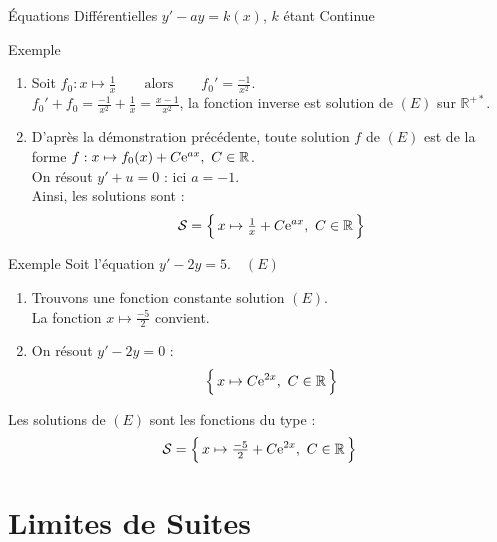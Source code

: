 \documentclass{coursbook}
\begin{document}
\begin{Gpartie}{Équations Différentielles $y'-ay=k(x)$, $k$ étant Continue}
\begin{Spartie}{Exemple}
            \begin{enumerate}
                \item Soit $f_0:x\mapsto\frac{1}{x}\qquad\text{alors}\qquad f_0'=\frac{-1}{x^2}$. \\
                $f_0'+f_0=\frac{-1}{x^2}+\frac{1}{x}=\frac{x-1}{x^2}$, la fonction inverse est solution de $(E)$ sur $\mathbb{R^{+*}}$.
                \item D'après la démonstration précédente, toute solution $f$ de $(E)$ est de la forme $f:x\mapsto f_0(x)+C\me^{ax},\ C\in\mathbb{R}$. \\
                On résout $y'+u=0$ : ici $a=-1$. \\
                Ainsi, les solutions sont :
                \[\mathcal{S}=\Big\{\,x\mapsto\tfrac{1}{x}+C\me^{ax},\ C\in\mathbb{R}\,\Big\}\]
            \end{enumerate}
        \end{Spartie}
        \begin{Spartie}{Exemple} 
            Soit l'équation $y'-2y=5$.$\quad(E)$
            \begin{enumerate}
                \item Trouvons une fonction constante solution $(E)$. \\
                La fonction $x\mapsto\frac{-5}{2}$ convient.
                \item On résout $y'-2y=0$ :
                \[\Big\{\,x\mapsto C\me^{2x},\ C\in\mathbb{R}\,\Big\}\]
            \end{enumerate}

            Les solutions de $(E)$ sont les fonctions du type :
            \[\mathcal{S}=\Big\{\,x\mapsto\tfrac{-5}{2}+C\me^{2x},\ C\in\mathbb{R}\,\Big\}\]
        \end{Spartie}
    \end{Gpartie}







    \chapter{Limites de Suites}
\end{document}
